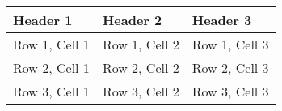 \documentclass{article}
\begin{document}
\begin{table}[]
\begin{tabular}{|l|l|l|}
\hline
Header 1 & Header 2 & Header 3 \\
\hline
Row 1, Cell 1 & Row 1, Cell 2 & Row 1, Cell 3 \\
\hline
Row 2, Cell 1 & Row 2, Cell 2 & Row 2, Cell 3 \\
\hline
Row 3, Cell 1 & Row 3, Cell 2 & Row 3, Cell 3 \\
\hline
\end{tabular}
\end{table}
\end{document}
